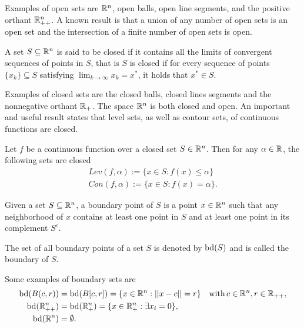 \documentclass[10pt,a4paper]{article}
\begin{document}
\noindent Examples of open sets are $\mathbb{R}^n$, open balls, open line segments, and the positive orthant $\mathbb{R}^n_{++}$. A known result is that a union of any number of open sets is an open set and the intersection of a finite number of open sets is open.
\begin{definition}
	A set $S\subseteq\mathbb{R}^n$ is said to be closed if it contains all the limits of convergent sequences of points in $S$, that is $S$ is closed if for every sequence of points $\{x_k\} \subseteq S$ satisfying $\displaystyle\lim_{k\to \infty} x_k\!=\! x^*$, it holds that $x^*\in S$.
\end{definition}
\noindent Examples of closed sets are the closed balls, closed lines segments and the nonnegative orthant $\mathbb{R}_+$. The space $\mathbb{R}^n$ is both closed and open. An important and useful result states that level sets, as well as contour sets, of
continuous functions are closed.
\begin{proposition}
	Let $f$ be a continuous function over a closed set $S\in\mathbb{R}^n$. Then for any $\alpha \in \mathbb{R}$, the following sets are closed
	\begin{equation*}
		\begin{split}
			Lev(f, \alpha) :=\{x\in S: f(x)\leq \alpha\}\\
			Con(f, \alpha) :=\{x\in S: f(x)= \alpha\}.
		\end{split}
	\end{equation*}
\end{proposition}
\begin{definition}
	Given a set $S\subseteq \mathbb{R}^n$, a boundary point of $S$ is a point $x\in \mathbb{R}^n$ such that any neighborhood of $x$ contains at least one point in $S$ and at least one point in its complement $S^c$.
\end{definition}
\noindent The set of all boundary points of a set $S$ is denoted by $\mathord{\mathrm{bd}}(S)$ and is called the boundary of $S$.
\begin{example}
	Some examples of boundary sets are 
	\begin{equation*}
		\begin{split}
			\mathord{\mathrm{bd}}(B(c,r))&= \mathord{\mathrm{bd}}(B[c,r]) = \{x\in \mathbb{R}^n: ||x-c||=r\} \quad \mathord{\mathrm{with }}\, c \in \mathbb{R}^n, r \in \mathbb{R}_{++},\\
			\mathord{\mathrm{bd}}(\mathbb{R}^n_{++}) &= \mathord{\mathrm{bd}}(\mathbb{R}^n_+) = \{x\in \mathbb{R}^n_+: \exists x_i = 0\},\\
			\mathord{\mathrm{bd}}(\mathbb{R}^n) &= \emptyset.
		\end{split}
	\end{equation*}
\end{example}
\end{document}
